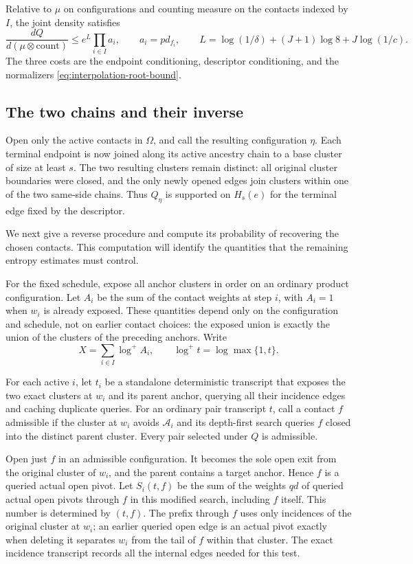 \documentclass[11pt]{article}
\theoremstyle{definition}
\begin{document}
Relative to $\mu$ on configurations and counting measure on the
contacts indexed by $I$, the joint density satisfies
\begin{equation}\label{eq:interpolation-density}
 \frac{dQ}{d(\mu\otimes\mathrm{count})}
 \le e^L\prod_{i\in I}a_i,
 \qquad a_i=pd_{f_i},
 \qquad
 L=\log(1/\delta)+(J+1)\log8+J\log(1/c).
\end{equation}
The three costs are the endpoint conditioning, descriptor conditioning,
and the normalizers \eqref{eq:interpolation-root-bound}.

\subsection{The two chains and their inverse}

Open only the active contacts in $\Omega$, and call the resulting
configuration $\eta$. Each terminal endpoint is now joined along its
active ancestry chain to a base cluster of size at least $s$. The two
resulting clusters remain distinct: all original cluster boundaries were
closed, and the only newly opened edges join clusters within one of the
two same-side chains. Thus $Q_\eta$ is supported on $H_s(e)$ for the
terminal edge fixed by the descriptor.

We next give a reverse procedure and compute its probability of recovering
the chosen contacts. This computation will identify the quantities that
the remaining entropy estimates must control.

For the fixed schedule, expose all anchor clusters in order on an
ordinary product configuration. Let $A_i$ be the sum of the contact
weights at step $i$, with $A_i=1$ when $w_i$ is already exposed. These
quantities depend only on the configuration and schedule, not on earlier
contact choices: the exposed union is exactly the union of the clusters
of the preceding anchors. Write
\[
 X=\sum_{i\in I}\log^+A_i,
 \qquad \log^+t=\log\max\{1,t\}.
\]

For each active $i$, let $t_i$ be a standalone deterministic transcript
that exposes the two exact clusters at $w_i$ and its parent anchor,
querying all their incidence edges and caching duplicate queries.
For an ordinary pair transcript $t$, call a contact $f$ admissible if
the cluster at $w_i$ avoids $\mathcal A_i$ and its depth-first search
queries $f$ closed into the distinct parent cluster. Every pair selected
under $Q$ is admissible.

Open just $f$ in an admissible configuration. It becomes the sole open
exit from the original cluster of $w_i$, and the parent contains a target
anchor. Hence $f$ is a queried actual open pivot. Let $S_i(t,f)$ be the
sum of the weights $qd$ of queried actual open pivots through $f$ in this
modified search, including $f$ itself. This number is determined by
$(t,f)$. The prefix through $f$ uses only incidences of the original
cluster at $w_i$; an earlier queried open edge is an actual pivot exactly
when deleting it separates $w_i$ from the tail of $f$ within that cluster.
The exact incidence transcript records all the internal edges needed for
this test.
\end{document}
